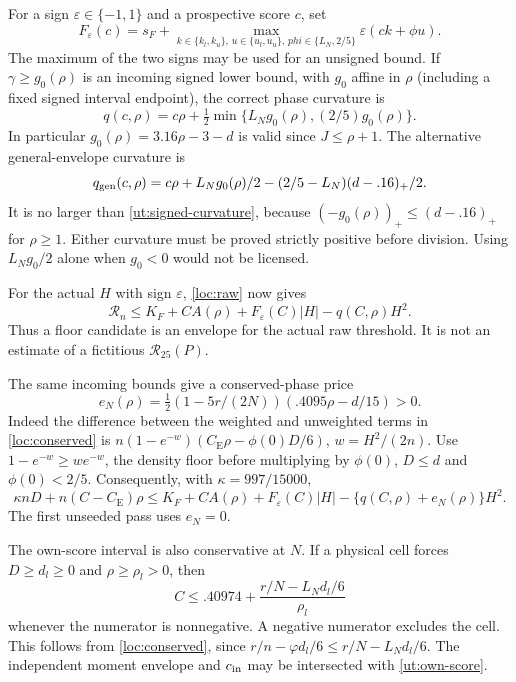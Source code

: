 \documentclass[aop,preprint]{imsart}
\theoremstyle{definition}
\newcommand{\CE}{C_{\mathrm E}}
\numberwithin{equation}{section}
\begin{document}
For a sign $\varepsilon\in\{-1,1\}$ and a prospective score $c$, set
\[
 F_\varepsilon(c)=s_F+
 \max_{k\in\{k_l,k_u\},\,u\in\{u_l,u_u\},\,phi\in\{L_N,2/5\}}
                  \varepsilon(ck+\phi u).
\]
The maximum of the two signs may be used for an unsigned bound.
If $\gamma\ge g_0(\rho)$ is an incoming signed lower bound, with
$g_0$ affine in $\rho$ (including a fixed signed interval endpoint),
the correct phase curvature is
\begin{equation}\label{ut:signed-curvature}
 q(c,\rho)=c\rho+\tfrac12
           \min\{L_N g_0(\rho),(2/5)g_0(\rho)\}.
\end{equation}
In particular $g_0(\rho)=3.16\rho-3-d$ is valid since
$J\le\rho+1$. The alternative general-envelope curvature is
\[
 q_{\rm gen}(c,\rho)=c\rho+L_Ng_0(\rho)/2
                    -(2/5-L_N)(d-.16)_+/2.
\]
It is no larger than \eqref{ut:signed-curvature}, because
$(-g_0(\rho))_+\le(d-.16)_+$ for $\rho\ge1$.
Either curvature must be proved strictly positive before division.
Using $L_Ng_0/2$ alone when $g_0<0$ would not be licensed.

For the actual $H$ with sign $\varepsilon$, \eqref{loc:raw} now gives
\begin{equation}\label{ut:raw-candidate}
 \mathcal R_n\le K_F+C A(\rho)+F_\varepsilon(C)|H|
                                      -q(C,\rho)H^2.
\end{equation}
Thus a floor candidate is an envelope for the actual raw threshold.
It is not an estimate of a fictitious $\mathcal R_{25}(P)$.

The same incoming bounds give a conserved-phase price
\begin{equation}\label{ut:rebate}
 e_N(\rho)=\tfrac12(1-5r/(2N))(.4095\rho-d/15)>0.
\end{equation}
Indeed the difference between the weighted and unweighted terms in
\eqref{loc:conserved} is
$n(1-e^{-w})(\CE\rho-\phi(0)D/6)$, $w=H^2/(2n)$.
Use $1-e^{-w}\ge we^{-w}$, the density floor before multiplying by
$\phi(0)$, $D\le d$ and $\phi(0)<2/5$.
Consequently, with $\kappa=997/15000$,
\begin{equation}\label{ut:charged-candidate}
 \kappa nD+n(C-\CE)\rho
 \le K_F+C A(\rho)+F_\varepsilon(C)|H|
                       -\{q(C,\rho)+e_N(\rho)\}H^2.
\end{equation}
The first unseeded pass uses $e_N=0$.

The own-score interval is also conservative at $N$. If a physical
cell forces $D\ge d_l\ge0$ and $\rho\ge\rho_l>0$, then
\begin{equation}\label{ut:own-score}
 C\le .40974+
 \frac{r/N-L_Nd_l/6}{\rho_l}
\end{equation}
whenever the numerator is nonnegative. A negative numerator excludes
the cell. This follows from \eqref{loc:conserved}, since
$r/n-\varphi d_l/6\le r/N-L_Nd_l/6$.
The independent moment envelope and $c_{\rm in}$ may be intersected
with \eqref{ut:own-score}.
\end{document}
